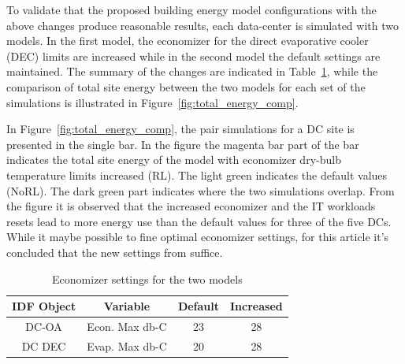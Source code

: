 To validate that the proposed building energy model configurations with the above changes produce reasonable results, each data-center is simulated with two models. In the first model, the economizer for the direct evaporative cooler (DEC) limits are increased while in the second model the default settings are maintained. The summary of the changes are indicated in Table~\ref{table:tab01}, while the comparison of total site energy between the two models for each set of the simulations is illustrated in Figure~\ref{fig:total_energy_comp}. 

In Figure~\ref{fig:total_energy_comp}, the pair simulations for a DC site is presented in the single bar. In the figure the magenta bar part of the bar indicates the total site energy of the model with economizer dry-bulb temperature limits increased (RL). The light green indicates the default values (NoRL). The dark green part indicates where the two simulations overlap. From the figure it is observed that the increased economizer and the IT workloads resets lead to more energy use than the default values for three of the five DCs. While it maybe possible to fine optimal economizer settings, for this article it's concluded that the new settings from suffice. 

  
  \begin{table}[ht]
  \begin{small}
    \vspace{-10 pt}
    \caption{Economizer settings for the two models}
    \label{table:tab01}
    \centering
    \begin{tabular}{| c | c | c |c| }
      \hline
      IDF Object & Variable & Default & Increased\\
      \hline  \hline
      DC-OA & Econ. Max db-C & 23 & 28 \\
      \hline
      DC DEC & Evap. Max db-C & 20 & 28 \\
      \hline
    \end{tabular}
    \vspace{-8 pt}   %
    \end{small}
    \end{table}

